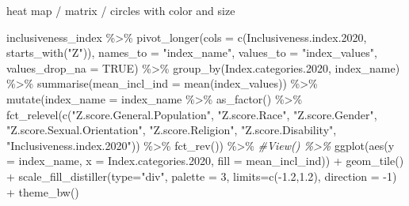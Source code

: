 \documentclass[
]{krantz}
\makeatletter
\newenvironment{Shaded}{\begin{snugshade}}{\end{snugshade}}
\newcommand{\AttributeTok}[1]{\textcolor[rgb]{0.61,0.61,0.61}{#1}}
\newcommand{\CommentTok}[1]{\textcolor[rgb]{0.37,0.37,0.37}{\textit{#1}}}
\newcommand{\ConstantTok}[1]{\textcolor[rgb]{0,0,0}{#1}}
\newcommand{\DecValTok}[1]{\textcolor[rgb]{0.06,0.06,0.06}{#1}}
\newcommand{\FloatTok}[1]{\textcolor[rgb]{0.06,0.06,0.06}{#1}}
\newcommand{\FunctionTok}[1]{\textcolor[rgb]{0,0,0}{#1}}
\newcommand{\NormalTok}[1]{#1}
\newcommand{\SpecialCharTok}[1]{\textcolor[rgb]{0,0,0}{#1}}
\newcommand{\StringTok}[1]{\textcolor[rgb]{0.5,0.5,0.5}{#1}}
\newenvironment{kframe}{%
\medskip{}
\setlength{\fboxsep}{.8em}
 \def\at@end@of@kframe{}%
 \ifinner\ifhmode%
  \def\at@end@of@kframe{\end{minipage}}%
  \begin{minipage}{\columnwidth}%
 \fi\fi%
 \def\FrameCommand##1{\hskip\@totalleftmargin \hskip-\fboxsep
 \colorbox{shadecolor}{##1}\hskip-\fboxsep
     \hskip-\linewidth \hskip-\@totalleftmargin \hskip\columnwidth}%
 \MakeFramed {\advance\hsize-\width
   \@totalleftmargin\z@ \linewidth\hsize
   \@setminipage}}%
 {\par\unskip\endMakeFramed%
 \at@end@of@kframe}
\renewenvironment{Shaded}{\begin{kframe}}{\end{kframe}}
\makeatother
\begin{document}
heat map / matrix / circles with color and size

\begin{Shaded}
\begin{Highlighting}[]
\NormalTok{inclusiveness\_index }\SpecialCharTok{\%\textgreater{}\%}
  \FunctionTok{pivot\_longer}\NormalTok{(}\AttributeTok{cols =} \FunctionTok{c}\NormalTok{(Inclusiveness.index}\FloatTok{.2020}\NormalTok{, }\FunctionTok{starts\_with}\NormalTok{(}\StringTok{"Z"}\NormalTok{)), }
               \AttributeTok{names\_to =} \StringTok{"index\_name"}\NormalTok{,}
               \AttributeTok{values\_to =} \StringTok{"index\_values"}\NormalTok{,}
               \AttributeTok{values\_drop\_na =} \ConstantTok{TRUE}\NormalTok{) }\SpecialCharTok{\%\textgreater{}\%}
  \FunctionTok{group\_by}\NormalTok{(Index.categories}\FloatTok{.2020}\NormalTok{, index\_name) }\SpecialCharTok{\%\textgreater{}\%}
  \FunctionTok{summarise}\NormalTok{(}\AttributeTok{mean\_incl\_ind =} \FunctionTok{mean}\NormalTok{(index\_values)) }\SpecialCharTok{\%\textgreater{}\%}
  \FunctionTok{mutate}\NormalTok{(}\AttributeTok{index\_name =}\NormalTok{ index\_name }\SpecialCharTok{\%\textgreater{}\%}
           \FunctionTok{as\_factor}\NormalTok{() }\SpecialCharTok{\%\textgreater{}\%}
           \FunctionTok{fct\_relevel}\NormalTok{(}\FunctionTok{c}\NormalTok{(}\StringTok{"Z.score.General.Population"}\NormalTok{, }\StringTok{"Z.score.Race"}\NormalTok{, }\StringTok{"Z.score.Gender"}\NormalTok{, }
                         \StringTok{"Z.score.Sexual.Orientation"}\NormalTok{, }\StringTok{"Z.score.Religion"}\NormalTok{, }
                         \StringTok{"Z.score.Disability"}\NormalTok{, }\StringTok{"Inclusiveness.index.2020"}\NormalTok{)) }\SpecialCharTok{\%\textgreater{}\%}
           \FunctionTok{fct\_rev}\NormalTok{()) }\SpecialCharTok{\%\textgreater{}\%}
  \CommentTok{\#View() \%\textgreater{}\%}
  \FunctionTok{ggplot}\NormalTok{(}\FunctionTok{aes}\NormalTok{(}\AttributeTok{y =}\NormalTok{ index\_name, }\AttributeTok{x =}\NormalTok{ Index.categories}\FloatTok{.2020}\NormalTok{, }\AttributeTok{fill =}\NormalTok{ mean\_incl\_ind)) }\SpecialCharTok{+}
    \FunctionTok{geom\_tile}\NormalTok{() }\SpecialCharTok{+}
    \FunctionTok{scale\_fill\_distiller}\NormalTok{(}\AttributeTok{type=}\StringTok{"div"}\NormalTok{, }\AttributeTok{palette =} \DecValTok{3}\NormalTok{, }
                         \AttributeTok{limits=}\FunctionTok{c}\NormalTok{(}\SpecialCharTok{{-}}\FloatTok{1.2}\NormalTok{,}\FloatTok{1.2}\NormalTok{), }
                         \AttributeTok{direction =} \SpecialCharTok{{-}}\DecValTok{1}\NormalTok{) }\SpecialCharTok{+}
  \FunctionTok{theme\_bw}\NormalTok{()}
\end{Highlighting}
\end{Shaded}
\end{document}
